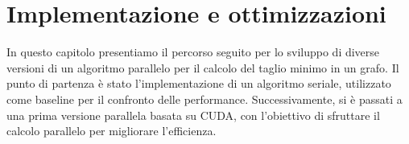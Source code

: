
        




    



\chapter{Implementazione e ottimizzazioni}

    In questo capitolo presentiamo il percorso seguito per lo sviluppo di diverse versioni di un algoritmo parallelo per il calcolo del taglio minimo in un grafo. Il punto di partenza è stato l'implementazione di un algoritmo seriale, utilizzato come baseline per il confronto delle performance. Successivamente, si è passati a una prima versione parallela basata su CUDA, con l'obiettivo di sfruttare il calcolo parallelo per migliorare l'efficienza.

